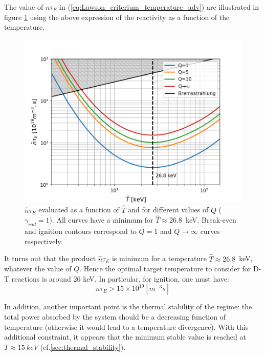 The value of $n \tau_E$ in (\ref{eq:Lawson_criterium_temperature_adv}) are illustrated in figure \ref{fig:ntau_E_vs_T_adv} using the above expression of the reactivity as a function of the temperature.

\begin{figure}[h]
	\begin{center}
	\includegraphics[width=1\textwidth]{figures/ntau_e_vs_T_loglog.png}
	\end{center}
    \caption{$\hat n \tau_E$ evaluated as a function of $\hat T$ and for different values of $Q$ ($\gamma_{rad}=1$). All curves have a minimum for $\hat T\approx 26.8$~keV. Break-even and ignition contours correspond to $Q=1$ and $Q \to\infty$ curves respectively.}
	\label{fig:ntau_E_vs_T_adv}
\end{figure}


It turns out that the product $\hat n \tau_E$ is minimum for a temperature $\hat T\approx 26.8$~keV, whatever the value of $Q$. Hence the optimal target temperature to consider for D-T reactions is around 26 \si{keV}. In particular, for ignition, one must have:
\begin{equation*}
    n \tau_E > 15 \times 10^{19} \si{\left[m^{-3} s \right]} 
\end{equation*}

In addition, another important point is the thermal stability of the regime: the total power absorbed by the system should be a decreasing function of temperature (otherwise it would lead to a temperature divergence). With this additional constraint, it appears that the minimum stable value is reached at $T\approx 15~\si{keV}$ (cf.\ref{sec:thermal_stability}).


